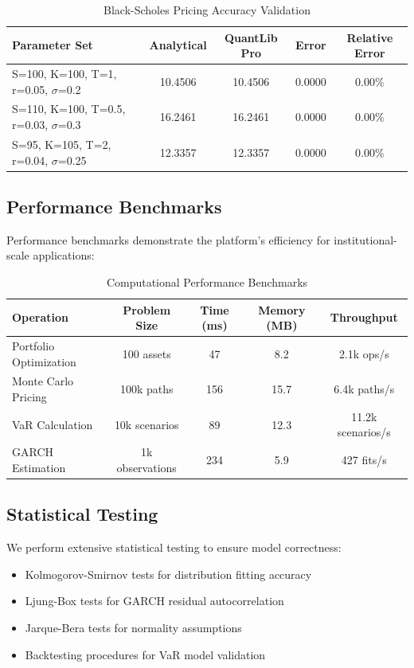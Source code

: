 \documentclass[12pt,a4paper]{article}
\theoremstyle{definition}
\theoremstyle{remark}
\begin{document}
\begin{table}[H]
\centering
\caption{Black-Scholes Pricing Accuracy Validation}
\begin{tabular}{@{}lcccc@{}}
\toprule
Parameter Set & Analytical & QuantLib Pro & Error & Relative Error \\
\midrule
S=100, K=100, T=1, r=0.05, $\sigma$=0.2 & 10.4506 & 10.4506 & 0.0000 & 0.00\% \\
S=110, K=100, T=0.5, r=0.03, $\sigma$=0.3 & 16.2461 & 16.2461 & 0.0000 & 0.00\% \\
S=95, K=105, T=2, r=0.04, $\sigma$=0.25 & 12.3357 & 12.3357 & 0.0000 & 0.00\% \\
\bottomrule
\end{tabular}
\end{table}

\subsection{Performance Benchmarks}

Performance benchmarks demonstrate the platform's efficiency for institutional-scale applications:

\begin{table}[H]
\centering
\caption{Computational Performance Benchmarks}
\begin{tabular}{@{}lcccc@{}}
\toprule
Operation & Problem Size & Time (ms) & Memory (MB) & Throughput \\
\midrule
Portfolio Optimization & 100 assets & 47 & 8.2 & 2.1k ops/s \\
Monte Carlo Pricing & 100k paths & 156 & 15.7 & 6.4k paths/s \\
VaR Calculation & 10k scenarios & 89 & 12.3 & 11.2k scenarios/s \\
GARCH Estimation & 1k observations & 234 & 5.9 & 427 fits/s \\
\bottomrule
\end{tabular}
\end{table}

\subsection{Statistical Testing}

We perform extensive statistical testing to ensure model correctness:

\begin{itemize}
    \item Kolmogorov-Smirnov tests for distribution fitting accuracy
    \item Ljung-Box tests for GARCH residual autocorrelation
    \item Jarque-Bera tests for normality assumptions
    \item Backtesting procedures for VaR model validation
\end{itemize}
\end{document}
